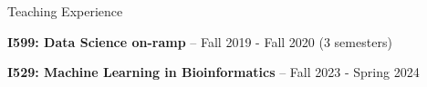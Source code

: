 \begin{rubric}{Teaching Experience}
\entry*[Lecturer]%
    
	\textbf{I599: Data Science on-ramp} -- Fall 2019 - Fall 2020 (3 semesters)
 
        \textbf{I529: Machine Learning in Bioinformatics} -- Fall 2023 - Spring 2024
\end{rubric}